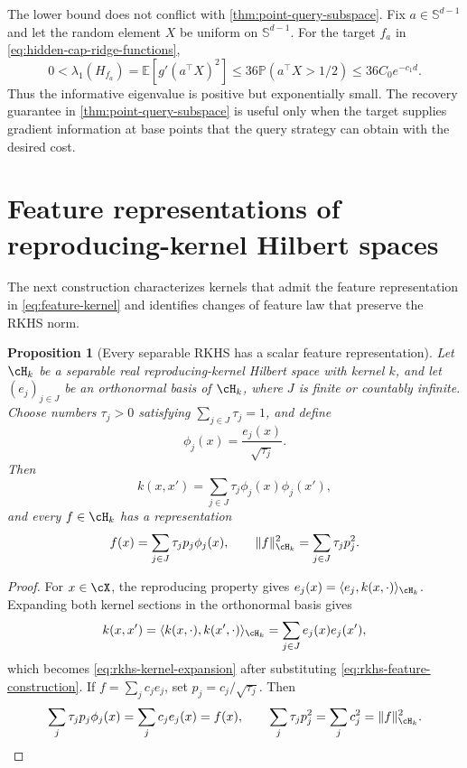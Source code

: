 \documentclass[11pt,twoside]{article}
\newcommand{\E}{\mathbb E}
\renewcommand{\P}{\mathbb P}
\newtheorem{proposition}[theorem]{Proposition}
\theoremstyle{definition}
\theoremstyle{remark}
\begin{document}
The lower bound does not conflict with
\cref{thm:point-query-subspace}. Fix $a\in\mathbb S^{d-1}$ and let the random
element $X$ be uniform on $\mathbb S^{d-1}$. For the target $f_a$ in
\cref{eq:hidden-cap-ridge-functions},
\begin{equation}
 0<\lambda_1(H_{f_a})
 =\E\!\left[g'(a^\top X)^2\right]
 \leq36\P(a^\top X>1/2)
 \leq36C_0e^{-c_1d}.
 \label{eq:hidden-cap-small-agop}
\end{equation}
Thus the informative eigenvalue is positive but exponentially small. The
recovery guarantee in \cref{thm:point-query-subspace} is useful only when the
target supplies gradient information
at base points that the query strategy can obtain with the desired cost.

\section{Feature representations of reproducing-kernel Hilbert spaces}
\label{app:rkhs-features}

The next construction characterizes kernels that admit the feature
representation in \cref{eq:feature-kernel} and identifies changes of feature
law that preserve the RKHS norm.

\begin{proposition}[Every separable RKHS has a scalar feature representation]
\label{prop:every-rkhs-feature-representation}
Let $\cH_k$ be a separable real reproducing-kernel Hilbert space with kernel
$k$, and let $(e_j)_{j\in J}$ be an orthonormal basis of $\cH_k$, where $J$
is finite or countably infinite. Choose numbers $\tau_j>0$ satisfying
$\sum_{j\in J}\tau_j=1$, and define
\begin{equation}
 \phi_j(x)=\frac{e_j(x)}{\sqrt{\tau_j}}.
 \label{eq:rkhs-feature-construction}
\end{equation}
Then
\begin{equation}
 k(x,x')=\sum_{j\in J}\tau_j\phi_j(x)\phi_j(x'),
 \label{eq:rkhs-kernel-expansion}
\end{equation}
and every $f\in\cH_k$ has a representation
\begin{equation}
 f(x)=\sum_{j\in J}\tau_jp_j\phi_j(x),
 \qquad
 \|f\|_{\cH_k}^2=\sum_{j\in J}\tau_jp_j^2.
 \label{eq:rkhs-norm-expansion}
\end{equation}
\end{proposition}

\begin{proof}
For $x\in\cX$, the reproducing property gives
$e_j(x)=\langle e_j,k(x,\cdot)\rangle_{\cH_k}$. Expanding both kernel
sections in the orthonormal basis gives
\[
 k(x,x')
 =\langle k(x,\cdot),k(x',\cdot)\rangle_{\cH_k}
 =\sum_{j\in J}e_j(x)e_j(x'),
\]
which becomes \cref{eq:rkhs-kernel-expansion} after substituting
\cref{eq:rkhs-feature-construction}. If
$f=\sum_jc_je_j$, set $p_j=c_j/\sqrt{\tau_j}$. Then
\[
 \sum_j\tau_jp_j\phi_j(x)=\sum_jc_je_j(x)=f(x),
 \qquad
 \sum_j\tau_jp_j^2=\sum_jc_j^2=\|f\|_{\cH_k}^2.
\]
\end{proof}
\end{document}
